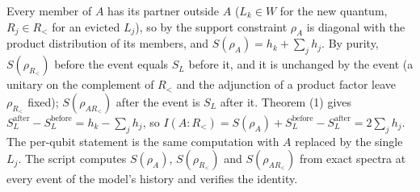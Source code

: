 Every member of $A$ has its partner outside $A$ ($L_k \in W$ for the new quantum, $R_j \in R_{<}$ for an evicted $L_j$), so by the support constraint $\rho_A$ is diagonal with the product distribution of its members, and $S(\rho_A) = h_k + \sum_j h_j$. By purity, $S(\rho_{R_<})$ before the event equals $S_L$ before it, and it is unchanged by the event (a unitary on the complement of $R_<$ and the adjunction of a product factor leave $\rho_{R_<}$ fixed); $S(\rho_{AR_<})$ after the event is $S_L$ after it. Theorem (1) gives $S_L^{\mathrm{after}} - S_L^{\mathrm{before}} = h_k - \sum_j h_j$, so $I(A{:}R_<) = S(\rho_A) + S_L^{\mathrm{before}} - S_L^{\mathrm{after}} = 2\sum_j h_j$. The per-qubit statement is the same computation with $A$ replaced by the single $L_j$. The script computes $S(\rho_A)$, $S(\rho_{R_<})$ and $S(\rho_{AR_<})$ from exact spectra at every event of the model's history and verifies the identity.
